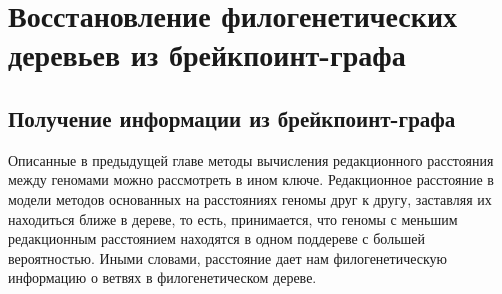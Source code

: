 \chapter{Восстановление филогенетических деревьев из брейкпоинт-графа}

\section{Получение информации из брейкпоинт-графа}
Описанные в предыдущей главе методы вычисления редакционного расстояния между геномами можно рассмотреть в ином ключе.
Редакционное расстояние в модели методов основанных на расстояниях  геномы друг к другу, заставляя их находиться ближе в дереве, то есть,
принимается, что геномы с меньшим редакционным расстоянием находятся в одном поддереве с большей вероятностью.
Иными словами, расстояние дает нам филогенетическую информацию о ветвях в филогенетическом дереве.

